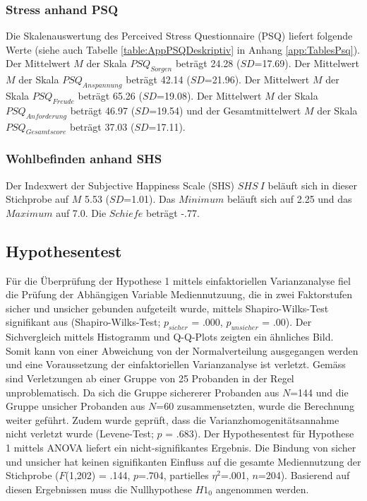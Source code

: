 \subsubsection{Stress anhand PSQ}
Die Skalenauswertung des Perceived Stress Questionnaire (PSQ) liefert folgende Werte (siehe auch Tabelle \ref{table:AppPSQDeskriptiv} in Anhang \ref{app:TablesPsq}). Der Mittelwert $M$ der Skala $PSQ_{Sorgen}$ beträgt 24.28 ($SD$=17.69). Der Mittelwert $M$ der Skala $PSQ_{Anspannung}$ beträgt 42.14 ($SD$=21.96). Der Mittelwert $M$ der Skala $PSQ_{Freude}$ beträgt 65.26 ($SD$=19.08). Der Mittelwert $M$ der Skala $PSQ_{Anforderung}$ beträgt 46.97 ($SD$=19.54) und der Gesamtmittelwert $M$ der Skala $PSQ_{Gesamtscore}$ beträgt 37.03 ($SD$=17.11).


\subsubsection{Wohlbefinden anhand SHS}
Der Indexwert der Subjective Happiness Scale (SHS) $SHS~I$ beläuft sich in dieser Stichprobe auf $M$ 5.53 ($SD$=1.01). Das $Minimum$ beläuft sich auf 2.25 und das $Maximum$ auf 7.0. Die $Schiefe$ beträgt -.77.

\subsection{Hypothesentest} \label{sec:Hypothesentest}
Für die Überprüfung der Hypothese 1 mittels einfaktoriellen Varianzanalyse fiel die Prüfung der Abhängigen Variable Mediennutzuung, die in zwei Faktorstufen sicher und unsicher gebunden aufgeteilt wurde, mittels Shapiro-Wilks-Test \cite{Shapiro1965} signifikant aus (Shapiro-Wilks-Test; $p_{sicher}$ = .000, $p_{unsicher}$ = .00). Der Sichvergleich mittels Histogramm und Q-Q-Plots zeigten ein ähnliches Bild. Somit kann von einer Abweichung von der Normalverteilung ausgegangen werden \cite{Hemmerich2018} und eine Voraussetzung der einfaktoriellen Varianzanalyse ist verletzt. Gemäss  sind Verletzungen ab einer Gruppe von 25 Probanden in der Regel unproblematisch. Da sich die Gruppe sichererer Probanden aus $N$=144 und die Gruppe unsicher Probanden aus $N$=60 zusammensetzten, wurde die Berechnung weiter geführt. Zudem wurde geprüft, dass die Varianzhomogenitätsannahme nicht verletzt wurde (Levene-Test; $p$ = .683). Der Hypothesentest für Hypothese 1 mittels ANOVA liefert ein nicht-signifikantes Er\-gebnis. Die Bindung von sicher und unsicher hat keinen signifikanten Einfluss auf die ge\-samte Medien\-nutzung der Stichprobe ($F$(1,202) = .144, $p$=.704, partielles $\eta^2$=.001, $n$=204). Basierend auf diesen Ergebnissen muss die Nullhypothese $H1_{0}$ angenommen werden. 


